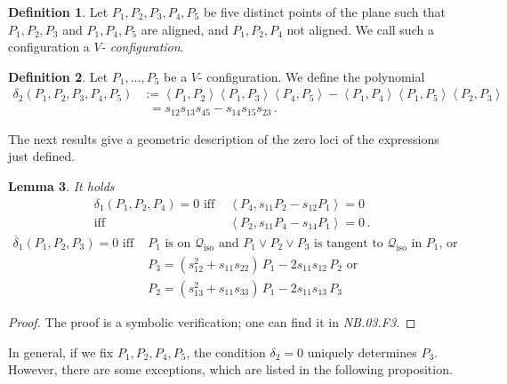 \documentclass[a4paper, 11pt, reqno]{amsart}
\theoremstyle{plain}
\newtheorem{lemma}{Lemma}[section]
\theoremstyle{definition}
\newtheorem{definition}[lemma]{Definition}
\newcommand{\nb}[2]{\textsl{{NB}.{#1}.{#2}}}
\newcommand{\iso}{\mathcal{Q}_{\mathrm{iso}}}
\newcommand{\scl}[2]{\left\langle {#1}, {#2} \right\rangle}
\begin{document}
\begin{definition}
\label{definition:Vconf}
Let $P_1, P_2, P_3, P_4, P_5$ be five distinct points of the plane
such that $P_1, P_2, P_3$ and $P_1, P_4, P_5$ are aligned, and 
$P_1,P_2,P_4$ not aligned.
We call such a configuration a \emph{$V$- configuration}.
\end{definition}

\begin{definition}
Let $P_1, \dots, P_5$ be a $V$- configuration.
We define the polynomial
%
\begin{align*}
  \delta_2(P_1, P_2, P_3, P_4, P_5) &:=
  \scl{P_1}{P_2} \scl{P_1}{P_3} \scl{P_4}{P_5} -
  \scl{P_1}{P_4} \scl{P_1}{P_5} \scl{P_2}{P_3} \\
  &\phantom{:}= s_{12}s_{13}s_{45}-s_{14}s_{15} s_{23} \,.
\end{align*}
%
\end{definition}

The next results give a geometric description of the zero loci of the expressions just defined.
\begin{lemma}
\label{lemma:characteristics_d1_d2}
It holds
%
\begin{align}
\label{lemma_delta_case1}
  \delta_1(P_1, P_2, P_4) = 0 \mbox{ iff } &\scl{P_4}{s_{11}P_2-s_{12}P_1} = 0\\
  \mbox{iff } &\scl{P_2}{s_{11}P_4-s_{14}P_1} = 0 \,. \nonumber
\end{align}
%
\begin{align}
\label{lemma_delta_case2}
  \overline{\delta}_1(P_1, P_2, P_3) = 0 \mbox{ iff } &
  P_1 \mbox{ is on~$\iso$ and } P_1 \vee P_2 \vee P_3 \mbox{ is tangent to~$\iso$ in $P_1$, or} \\
  & P_3 = (s_{12}^2+s_{11}s_{22}) \, P_1 - 2s_{11}s_{12} \, P_2 \mbox{ or} \nonumber \\
  & P_2 = (s_{13}^2+s_{11}s_{33}) \, P_1 - 2s_{11}s_{13} \, P_3 \nonumber
\end{align}
%
\end{lemma}
\begin{proof}
 The proof is a symbolic verification; one can find it in \nb{03}{F3}.
\end{proof}

In general, if we fix $P_1,P_2,P_4,P_5$, the condition
$\delta_2=0$ uniquely determines $P_3$. However, there are some exceptions, which are listed in the following proposition.
\end{document}
